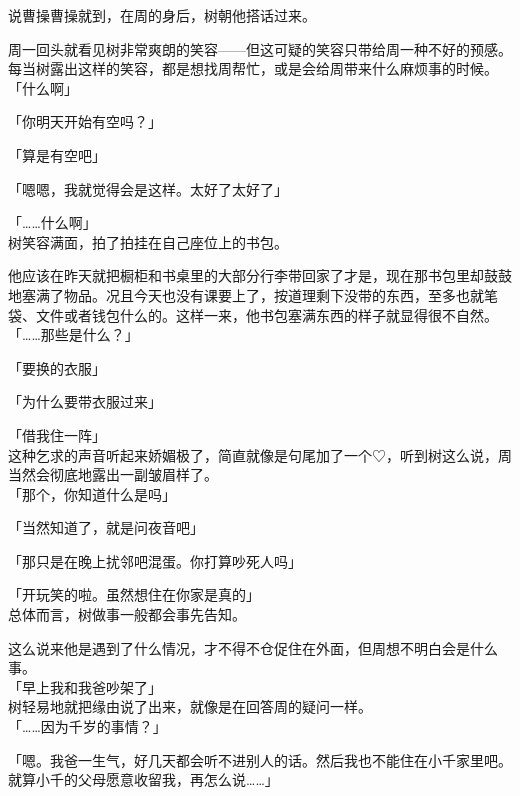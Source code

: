 说曹操曹操就到，在周的身后，树朝他搭话过来。

周一回头就看见树非常爽朗的笑容——但这可疑的笑容只带给周一种不好的预感。每当树露出这样的笑容，都是想找周帮忙，或是会给周带来什么麻烦事的时候。\\

「什么啊」

「你明天开始有空吗？」

「算是有空吧」

「嗯嗯，我就觉得会是这样。太好了太好了」

「……什么啊」\\

树笑容满面，拍了拍挂在自己座位上的书包。

他应该在昨天就把橱柜和书桌里的大部分行李带回家了才是，现在那书包里却鼓鼓地塞满了物品。况且今天也没有课要上了，按道理剩下没带的东西，至多也就笔袋、文件或者钱包什么的。这样一来，他书包塞满东西的样子就显得很不自然。\\

「……那些是什么？」

「要换的衣服」

「为什么要带衣服过来」

「借我住一阵」\\

这种乞求的声音听起来娇媚极了，简直就像是句尾加了一个♡，听到树这么说，周当然会彻底地露出一副皱眉样了。\\

「那个，你知道什么是吗」

「当然知道了，就是问夜音吧」

「那只是在晚上扰邻吧混蛋。你打算吵死人吗」

「开玩笑的啦。虽然想住在你家是真的」\\

总体而言，树做事一般都会事先告知。

这么说来他是遇到了什么情况，才不得不仓促住在外面，但周想不明白会是什么事。\\

「早上我和我爸吵架了」\\

树轻易地就把缘由说了出来，就像是在回答周的疑问一样。\\

「……因为千岁的事情？」

「嗯。我爸一生气，好几天都会听不进别人的话。然后我也不能住在小千家里吧。就算小千的父母愿意收留我，再怎么说……」

